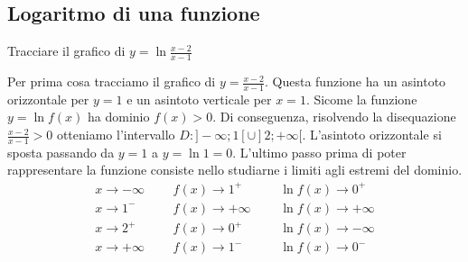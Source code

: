 \documentclass{article}     %
\begin{document}
    \subsection{Logaritmo di una funzione}
        \begin{ex*}
            Tracciare il grafico di $y=\ln{\frac{x-2}{x-1}}$
        \end{ex*}
        Per prima cosa tracciamo il grafico di $y=\frac{x-2}{x-1}$. Questa funzione ha un asintoto orizzontale per $y=1$ e un asintoto verticale per $x=1$. Sicome la funzione $y=\ln f(x)$ ha dominio $f(x)> 0$. Di conseguenza, risolvendo la disequazione $\frac{x-2}{x-1}> 0$ otteniamo l'intervallo $D: ]-\infty;1[\cup]2;+\infty[$. L'asintoto orizzontale si sposta passando da $y=1$ a $y=\ln 1=0$. L'ultimo passo prima di poter rappresentare la funzione consiste nello studiarne i limiti agli estremi del dominio.
        \[\renewcommand{\arraystretch}{1.8}\begin{array}{lllll}
            x \rightarrow -\infty &~~~& f(x)\rightarrow 1^+ &~~~& \ln{f(x)}\rightarrow 0^+\\
            x \rightarrow 1^- &~~~& f(x)\rightarrow +\infty &~~~& \ln{f(x)}\rightarrow +\infty\\
            x \rightarrow 2^+ &~~~& f(x)\rightarrow 0^+ &~~~& \ln{f(x)}\rightarrow -\infty\\
            x \rightarrow +\infty &~~~& f(x)\rightarrow 1^- &~~~& \ln{f(x)}\rightarrow 0^-\\
        \end{array}\]
\end{document}
